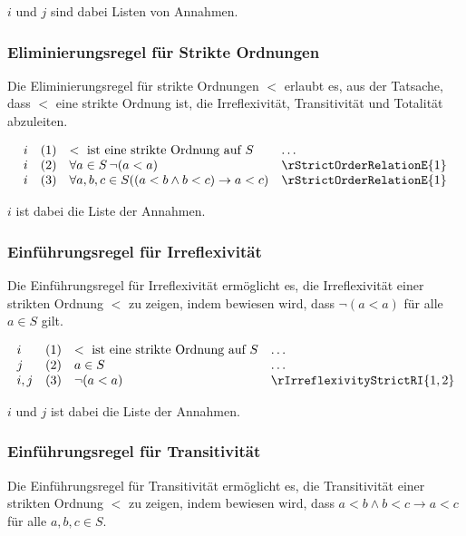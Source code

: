 \documentclass{book}
\theoremstyle{plain}
\theoremstyle{remark}
\theoremstyle{definition}
\begin{document}
\(i\) und \(j\) sind dabei Listen von Annahmen.

\subsubsection*{Eliminierungsregel für Strikte Ordnungen}
\label{rule:rStrictOrderRelationE}
Die Eliminierungsregel für strikte Ordnungen \(<\) erlaubt es, aus der Tatsache, dass \(<\) eine strikte Ordnung ist, die Irreflexivität, Transitivität und Totalität abzuleiten.

\[
\begin{array}{llll}
    i       & (1) & < \text{ ist eine strikte Ordnung auf } S & \dots \\
    i       & (2) & \forall a \in S \, \neg (a < a) & \rStrictOrderRelationE{1} \\
    i       & (3) & \forall a, b, c \in S ((a < b \land b < c) \rightarrow a < c) & \rStrictOrderRelationE{1} \\
\end{array}
\]

\(i\) ist dabei die Liste der Annahmen.

\subsubsection*{Einführungsregel für Irreflexivität}
\label{rule:rIrreflexivityStrictRI}
Die Einführungsregel für Irreflexivität ermöglicht es, die Irreflexivität einer strikten Ordnung \(<\) zu zeigen, indem bewiesen wird, dass \( \neg (a < a) \) für alle \(a \in S\) gilt.

\[
\begin{array}{llll}
    i       & (1) & < \text{ ist eine strikte Ordnung auf } S & \dots \\
    j       & (2) & a \in S & \dots \\
    i,j     & (3) & \neg (a < a) & \rIrreflexivityStrictRI{1,2}
\end{array}
\]

\(i\) und \(j\) ist dabei die Liste der Annahmen.

\subsubsection*{Einführungsregel für Transitivität}
\label{rule:rTransitivityStrictRI}
Die Einführungsregel für Transitivität ermöglicht es, die Transitivität einer strikten Ordnung \(<\) zu zeigen, indem bewiesen wird, dass \(a < b \land b < c \rightarrow a < c\) für alle \(a, b, c \in S\).
\end{document}
